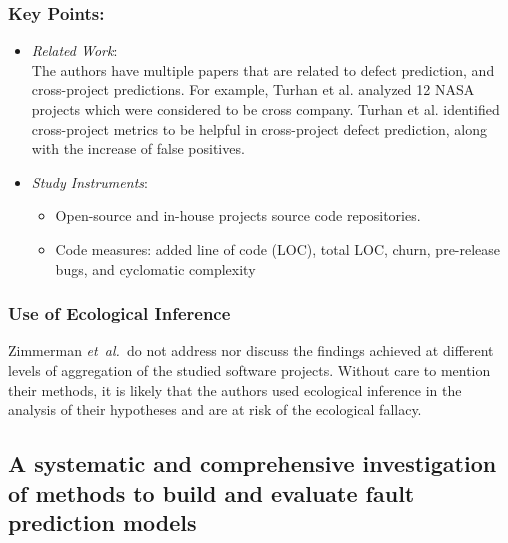 \documentclass{sig-alternate-05-2015}
\newcommand{\etal}{\mbox{\emph{et al.\ }}}
\begin{document}
\subsubsection{Key Points:}
\begin{itemize}
\item \emph{Related Work}: \\
The authors have multiple papers that are related to defect prediction, and cross-project predictions. For example, Turhan et al. \cite{Turhan:2009} analyzed 12 NASA projects which were considered to be cross company. Turhan et al. identified cross-project metrics to be helpful in cross-project defect prediction, along with the increase of false positives.
\item \emph{Study Instruments}:
	\begin{itemize}
	\item Open-source and in-house projects source code repositories.
	\item Code measures: added line of code (LOC), total LOC, churn, pre-release bugs, and cyclomatic complexity
	\end{itemize}
\end{itemize}

\subsubsection{Use of Ecological Inference}
Zimmerman \etal do not address nor discuss the findings achieved at different levels of aggregation of the studied software projects.  Without care to mention their methods, it is likely that the authors used ecological inference in the analysis of their hypotheses and are at risk of the ecological fallacy.

\subsection{A systematic and comprehensive investigation of methods to build and evaluate fault prediction models \cite{Arisholm:2010}}
\end{document}
